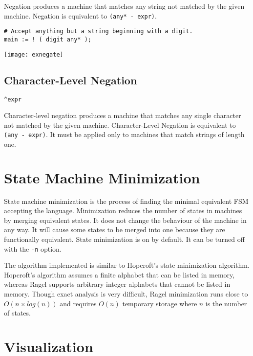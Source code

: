 \documentclass[letterpaper,11pt,oneside]{book}
\newcommand{\verbspace}{\vspace{10pt}}
\newcommand{\graphspace}{\vspace{10pt}}
\newenvironment{inline_code}{\def\baselinestretch{1}\vspace{12pt}\small}{}
\begin{document}
Negation produces a machine that matches any string not matched by the given
machine. Negation is equivalent to \verb|(any* - expr)|.

\begin{inline_code}
\begin{verbatim}
# Accept anything but a string beginning with a digit.
main := ! ( digit any* );
\end{verbatim}
\end{inline_code}

\graphspace
\begin{center}
\texttt{[image: exnegate]}
\end{center}
\graphspace

\subsection{Character-Level Negation}

\verb|^expr|
\verbspace

Character-level negation produces a machine that matches any single character
not matched by the given machine. Character-Level Negation is equivalent to
\verb|(any - expr)|. It must be applied only to machines that match strings of
length one.

\section{State Machine Minimization}

State machine minimization is the process of finding the minimal equivalent FSM accepting
the language. Minimization reduces the number of states in machines
by merging equivalent states. It does not change the behaviour of the machine
in any way. It will cause some states to be merged into one because they are
functionally equivalent. State minimization is on by default. It can be turned
off with the \verb|-n| option.

The algorithm implemented is similar to Hopcroft's state minimization
algorithm. Hopcroft's algorithm assumes a finite alphabet that can be listed in
memory, whereas Ragel supports arbitrary integer alphabets that cannot be
listed in memory. Though exact analysis is very difficult, Ragel minimization
runs close to $O(n \times log(n))$ and requires $O(n)$ temporary storage where
$n$ is the number of states.

\section{Visualization}
\label{visualization}
\end{document}
